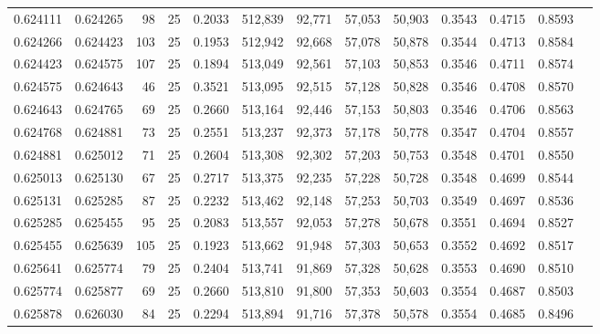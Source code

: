 \begin{tabular}{rrrrrrrrrrrrr}
0.624111 & 0.624265 &    98 &  25 &                                     0.2033 & 512,839 &  92,771 &  57,053 &  50,903 & 0.3543 & 0.4715 & 0.8593 \\
0.624266 & 0.624423 &   103 &  25 &                                     0.1953 & 512,942 &  92,668 &  57,078 &  50,878 & 0.3544 & 0.4713 & 0.8584 \\
0.624423 & 0.624575 &   107 &  25 &                                     0.1894 & 513,049 &  92,561 &  57,103 &  50,853 & 0.3546 & 0.4711 & 0.8574 \\
0.624575 & 0.624643 &    46 &  25 &                                     0.3521 & 513,095 &  92,515 &  57,128 &  50,828 & 0.3546 & 0.4708 & 0.8570 \\
0.624643 & 0.624765 &    69 &  25 &                                     0.2660 & 513,164 &  92,446 &  57,153 &  50,803 & 0.3546 & 0.4706 & 0.8563 \\
0.624768 & 0.624881 &    73 &  25 &                                     0.2551 & 513,237 &  92,373 &  57,178 &  50,778 & 0.3547 & 0.4704 & 0.8557 \\
0.624881 & 0.625012 &    71 &  25 &                                     0.2604 & 513,308 &  92,302 &  57,203 &  50,753 & 0.3548 & 0.4701 & 0.8550 \\
0.625013 & 0.625130 &    67 &  25 &                                     0.2717 & 513,375 &  92,235 &  57,228 &  50,728 & 0.3548 & 0.4699 & 0.8544 \\
0.625131 & 0.625285 &    87 &  25 &                                     0.2232 & 513,462 &  92,148 &  57,253 &  50,703 & 0.3549 & 0.4697 & 0.8536 \\
0.625285 & 0.625455 &    95 &  25 &                                     0.2083 & 513,557 &  92,053 &  57,278 &  50,678 & 0.3551 & 0.4694 & 0.8527 \\
0.625455 & 0.625639 &   105 &  25 &                                     0.1923 & 513,662 &  91,948 &  57,303 &  50,653 & 0.3552 & 0.4692 & 0.8517 \\
0.625641 & 0.625774 &    79 &  25 &                                     0.2404 & 513,741 &  91,869 &  57,328 &  50,628 & 0.3553 & 0.4690 & 0.8510 \\
0.625774 & 0.625877 &    69 &  25 &                                     0.2660 & 513,810 &  91,800 &  57,353 &  50,603 & 0.3554 & 0.4687 & 0.8503 \\
0.625878 & 0.626030 &    84 &  25 &                                     0.2294 & 513,894 &  91,716 &  57,378 &  50,578 & 0.3554 & 0.4685 & 0.8496 \\

\end{tabular}
